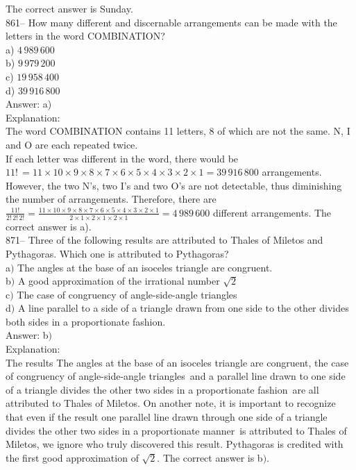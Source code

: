 \documentclass[letterpaper, 12pt]{article}
\begin{document}
The correct answer is Sunday.  \\

861-- How many different and discernable arrangements can be made with the letters in the word \sloppy \mbox{COMBINATION?}\\

a) $4\,989\,600$\\
b) $9\,979\,200$\\
c) $19\,958\,400$\\
d) $39\,916\,800$\\

Answer: a)\\

Explanation: \\
The word COMBINATION contains 11 letters, 8 of which are not the same. N, I and O are each repeated twice.\\
If each letter was different in the word, there would be
$11!\,=11\times10\times9\times8\times7\times6\times5\times4\times3\times2\times1=39\,916\,800$
arrangements.  However, the two N's, two I's and two O's are not detectable, thus diminishing the number of arrangements. Therefore, there are
$\frac{11!}{2!\,2!\,2!}=\frac{11\times10\times9\times8\times7\times6\times5\times4\times3\times2\times1}{2\times1\times2\times1\times2\times1}=4\,989\,600$
different arrangements. The correct answer is a).\\

871-- Three of the following results are attributed to Thales of Miletos and Pythagoras. Which one is attributed to Pythagoras?\\

a$)$ The angles at the base of an isoceles triangle are congruent.\\
b$)$ A good approximation of the irrational number $\sqrt2$ \\
c$)$ The case of congruency of angle-side-angle triangles \\
d$)$ A line parallel to a side of a triangle drawn from one side to the other divides both sides in a proportionate fashion.\\

Answer: b$)$\\

Explanation: \\
The results \og The angles at the base of an isoceles triangle are congruent\fg , \og the case of congruency of angle-side-angle triangles\fg\ and  \og a parallel line drawn to one side of a triangle divides the other two sides in a proportionate fashion\fg\ are all attributed to Thales of Miletos. On another note, it is important to recognize that even if the result \og one parallel line drawn through one side of a triangle divides the other two sides in a proportionate manner\fg\ is attributed to Thales of Miletos, we ignore who truly discovered this result. Pythagoras is credited with the first good approximation of $\sqrt2$. The correct answer is b$)$.
\end{document}
